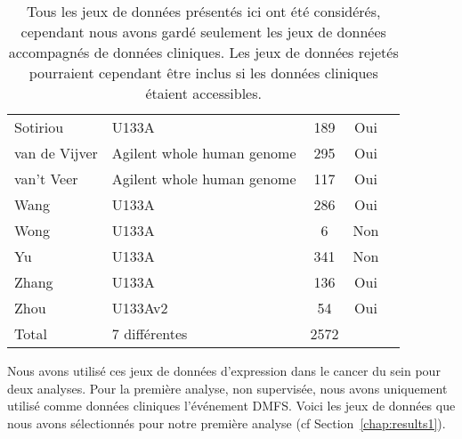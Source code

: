 \begin{table}
\begin{center}
\begin{tabular}{llccc}
						Sotiriou		& U133A								& 189	& Oui	\\
						van de Vijver	& Agilent whole human genome		& 295	& Oui	\\
						van't Veer		& Agilent whole human genome		& 117	& Oui	\\
						Wang			& U133A								& 286	& Oui	\\
						Wong			& U133A								& 6		& Non	\\
						Yu				& U133A								& 341	& Non	\\
						Zhang			& U133A								& 136	& Oui	\\
						Zhou			& U133Av2							& 54	& Oui	\\
						\midrule
						Total			& 7 différentes						& 2572	&		\\
						\bottomrule
					\end{tabular}
					\label{tab:MetDatasets}
					\vspace{3ex}
					\caption*{Tous les jeux de données présentés ici ont été considérés, cependant nous avons gardé seulement les jeux de données accompagnés de données cliniques. Les jeux de données rejetés pourraient cependant être inclus si les données cliniques étaient accessibles.}
				\end{center}
			\end{table}

			Nous avons utilisé ces jeux de données d'expression dans le cancer du sein pour deux analyses.
			Pour la première analyse, non supervisée, nous avons uniquement utilisé comme données cliniques l'événement \acs{DMFS}.
			Voici les jeux de données que nous avons sélectionnés pour notre première analyse (cf Section~\ref{chap:results1}).


